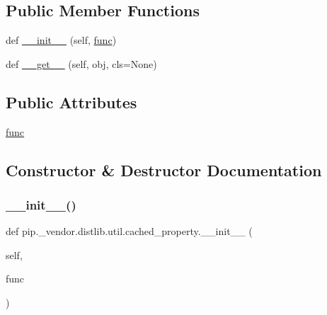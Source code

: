 \subsection*{Public Member Functions}
\begin{DoxyCompactItemize}
\item 
def \hyperlink{classpip_1_1__vendor_1_1distlib_1_1util_1_1cached__property_a3a7f56aab060c0eb8457e2bcff96e0f1}{\+\_\+\+\_\+init\+\_\+\+\_\+} (self, \hyperlink{classpip_1_1__vendor_1_1distlib_1_1util_1_1cached__property_a44858451d06131be8e10e7295deba3c1}{func})
\item 
def \hyperlink{classpip_1_1__vendor_1_1distlib_1_1util_1_1cached__property_ab05a23b833cbbdfa0c7077feb3c0b364}{\+\_\+\+\_\+get\+\_\+\+\_\+} (self, obj, cls=None)
\end{DoxyCompactItemize}
\subsection*{Public Attributes}
\begin{DoxyCompactItemize}
\item 
\hyperlink{classpip_1_1__vendor_1_1distlib_1_1util_1_1cached__property_a44858451d06131be8e10e7295deba3c1}{func}
\end{DoxyCompactItemize}


\subsection{Constructor \& Destructor Documentation}
\mbox{\label{classpip_1_1__vendor_1_1distlib_1_1util_1_1cached__property_a3a7f56aab060c0eb8457e2bcff96e0f1}} 
\subsubsection{\texorpdfstring{\+\_\+\+\_\+init\+\_\+\+\_\+()}{\_\_init\_\_()}}
{\footnotesize\ttfamily def pip.\+\_\+vendor.\+distlib.\+util.\+cached\+\_\+property.\+\_\+\+\_\+init\+\_\+\+\_\+ (\begin{DoxyParamCaption}\item[{}]{self,  }\item[{}]{func }\end{DoxyParamCaption})}



